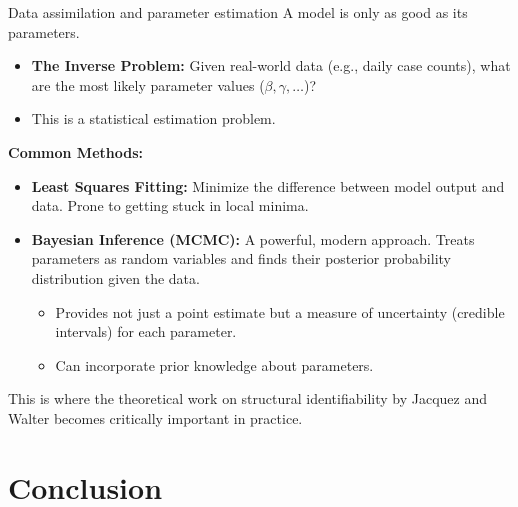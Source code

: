 \documentclass[aspectratio=169]{beamer}\usepackage[]{graphicx}\usepackage[]{xcolor}
\begin{document}
\begin{frame}{Data assimilation and parameter estimation}
    A model is only as good as its parameters.
    \begin{itemize}
        \item \textbf{The Inverse Problem:} Given real-world data (e.g., daily case counts), what are the most likely parameter values ($\beta, \gamma, \dots$)?
        \item This is a statistical estimation problem.
    \end{itemize}
    \vfill
    \textbf{Common Methods:}
    \begin{itemize}
        \item \textbf{Least Squares Fitting:} Minimize the difference between model output and data. Prone to getting stuck in local minima.
        \item \textbf{Bayesian Inference (MCMC):} A powerful, modern approach. Treats parameters as random variables and finds their posterior probability distribution given the data.
        \begin{itemize}
            \item Provides not just a point estimate but a measure of uncertainty (credible intervals) for each parameter.
            \item Can incorporate prior knowledge about parameters.
        \end{itemize}
    \end{itemize}
    This is where the theoretical work on structural identifiability by Jacquez and Walter becomes critically important in practice.
\end{frame}

\section{Conclusion}
\end{document}
